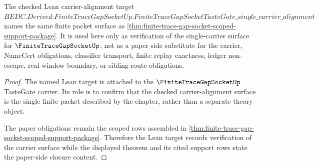 \begin{theorem}
\label{thm:finite-trace-gap-socket-tastegate-alignment-record}
The checked Lean carrier-alignment target
$BEDC.Derived.FiniteTraceGapSocketUp.FiniteTraceGapSocketTasteGate\_single\_carrier\_alignment$
names the same finite packet surface as \autoref{thm:finite-trace-gap-socket-scoped-support-package}. It is used here only as verification of the single-carrier surface for $\FiniteTraceGapSocketUp$, not as a paper-side substitute for the carrier, NameCert obligations, classifier transport, finite replay exactness, ledger non-escape, real-window boundary, or sibling-route obligations.
\end{theorem}
\begin{proof}
The named Lean target is attached to the $\FiniteTraceGapSocketUp$ TasteGate carrier. Its role is to confirm that the checked carrier-alignment surface is the single finite packet described by the chapter, rather than a separate theory object.

The paper obligations remain the scoped rows assembled in \autoref{thm:finite-trace-gap-socket-scoped-support-package}. Therefore the Lean target records verification of the carrier surface while the displayed theorem and its cited support rows state the paper-side closure content.
\end{proof}

